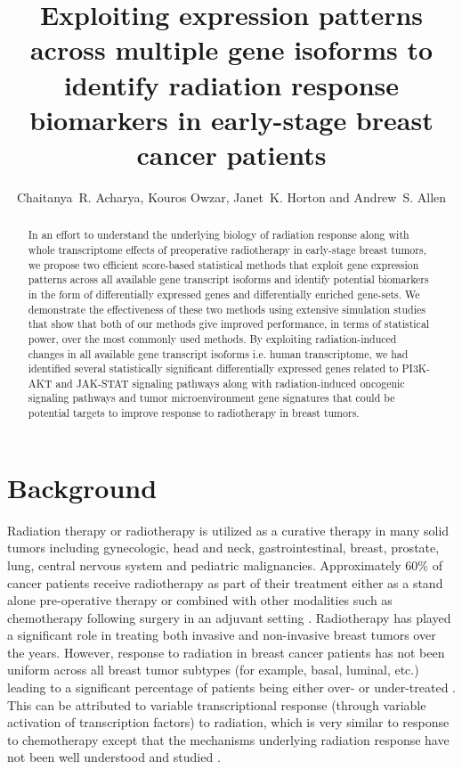 \documentclass[hidelinks,11pt]{article}
\title{Exploiting expression patterns across multiple gene isoforms to identify radiation response biomarkers in early-stage breast cancer patients}
\author{Chaitanya~R. Acharya, Kouros Owzar, Janet~K. Horton and Andrew~S. Allen}
\date{}
\begin{document}
\maketitle



\begin{abstract}
In an effort to understand the underlying biology of radiation response along with whole transcriptome effects of preoperative radiotherapy in early-stage breast tumors, we propose two efficient score-based statistical methods that exploit gene expression patterns across all available gene transcript isoforms and identify potential biomarkers in the form of differentially expressed genes and differentially enriched gene-sets. We demonstrate the effectiveness of these two methods using extensive simulation studies that show that both of our methods give improved performance, in terms of statistical power, over the most commonly used methods. By exploiting radiation-induced changes in all available gene transcript isoforms i.e. human transcriptome, we had identified several statistically significant differentially expressed genes related to PI3K-AKT and JAK-STAT signaling pathways along with radiation-induced oncogenic signaling pathways and tumor microenvironment gene signatures that could be potential targets to improve response to radiotherapy in breast tumors. 
\end{abstract}

\section*{Background}

Radiation therapy or radiotherapy is utilized as a curative therapy in many solid tumors including gynecologic, head and neck, gastrointestinal, breast, prostate, lung, central nervous system and pediatric malignancies. Approximately 60\% of cancer patients receive radiotherapy as part of their treatment either as a stand alone pre-operative therapy or combined with other modalities such as chemotherapy following surgery in an adjuvant setting \cite{radonc_book}. Radiotherapy has played a significant role in treating both invasive and non-invasive breast tumors over the years. However, response to radiation in breast cancer patients has not been uniform across all breast tumor subtypes (for example, basal, luminal, etc.) leading to a significant percentage of patients being either over- or under-treated \cite{fas,subtypes_rad}. This can be attributed to variable transcriptional response (through variable activation of transcription factors) to radiation, which is very similar to response to chemotherapy except that the mechanisms underlying radiation response have not been well understood and studied \cite{Macaeva,Wushou2015}. 
\end{document}
